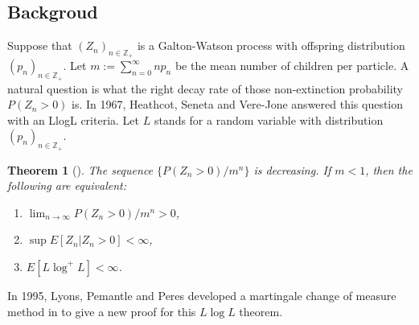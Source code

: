 \documentclass[12pt,a4paper]{amsart}
\numberwithin{equation}{section}
\theoremstyle{plain}
\newtheorem{thm}{Theorem}[section]
\theoremstyle{definition}
\begin{document}
\subsection{Backgroud}
  Suppose that $(Z_n)_{n \in \mathbb Z_+}$ is a Galton-Watson process with offspring distribution $(p_n)_{n\in \mathbb Z_+}$. 
  Let $m:=\sum^{\infty}_{n=0}np_n$ be the mean number of children per particle.
  A natural question is what the right decay rate of those non-extinction probability $P(Z_n >0)$ is.
  In 1967, Heathcot, Seneta and Vere-Jone \cite{HeathcoteSenetaVere-Jones1967Refinement} answered this question with an LlogL criteria.
  Let $L$ stands for a random variable with distribution $(p_n)_{n \in \mathbb Z_+}$.
  \begin{thm}[\cite{HeathcoteSenetaVere-Jones1967Refinement}]
    The sequence $\{ P(Z_n>0)/m^n\}$ is decreasing. 
    If $m<1$, then the following are equivalent:
    \begin{enumerate}
    \item $\lim_{n\rightarrow\infty}P(Z_n>0)/m^n>0$,
    \item $\sup E[Z_n|Z_n>0]<\infty$,
    \item $E\left[L\log^+ L\right]<\infty$.
    \end{enumerate}
  \end{thm}
  In 1995, Lyons, Pemantle and Peres developed a martingale change of measure method in \cite{LyonsPemantlePeres1995Conceptual} to give a new proof for this $L\log L$ theorem.
\end{document}

